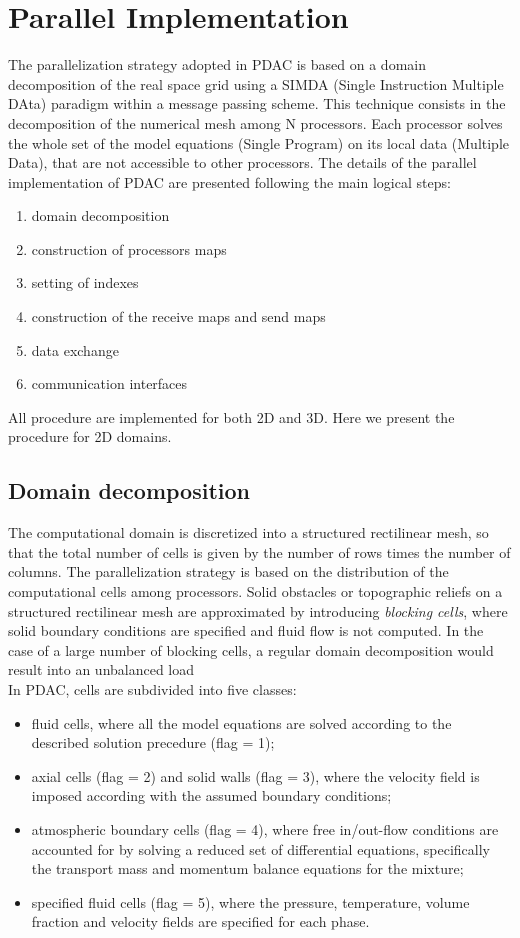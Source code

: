 \section{Parallel Implementation}
%
The parallelization strategy adopted in PDAC is based on a domain decomposition
of the real space grid using a SIMDA (Single Instruction Multiple DAta) paradigm
within a message passing scheme. This technique consists in the decomposition
of the numerical mesh among N processors. Each processor solves the whole set of
the model equations (Single Program) on its local data (Multiple Data),
that are not accessible to other processors.
%
The details of the parallel implementation of PDAC are
presented following the main logical steps:
\begin{enumerate}
\item domain decomposition
\item construction of processors maps
\item setting of indexes
\item construction of the receive maps and send maps
\item data exchange
\item communication interfaces
\end{enumerate}
% 
All procedure are implemented for both 2D and 3D. Here we present the
procedure for 2D domains.
%
\subsection{Domain decomposition}
The computational domain
is discretized into a structured rectilinear mesh, so that the total number
of cells is given by the number of rows times the number of columns.
The parallelization strategy is based on the distribution of the 
computational cells among processors.
Solid obstacles or topographic reliefs on a structured rectilinear mesh are 
approximated by introducing {\em blocking cells}, where solid boundary 
conditions are specified and fluid flow is not computed.
In the case of a large number of blocking cells, a regular domain decomposition
would result into an unbalanced load\\
In PDAC, cells are subdivided into five classes:
\begin{itemize}
\item fluid cells, where all the model equations are solved according to the described solution precedure (flag = 1);
\item axial cells (flag = 2) and solid walls (flag = 3), where the velocity 
field is imposed according with the assumed boundary conditions; 
\item atmospheric boundary cells (flag = 4), where free in/out-flow 
conditions are accounted for by solving a reduced set of differential 
equations, specifically the transport mass and momentum balance equations 
for the mixture;
\item specified fluid cells (flag = 5), where the pressure, temperature, 
volume fraction and velocity fields are specified for each phase.
\end{itemize}

